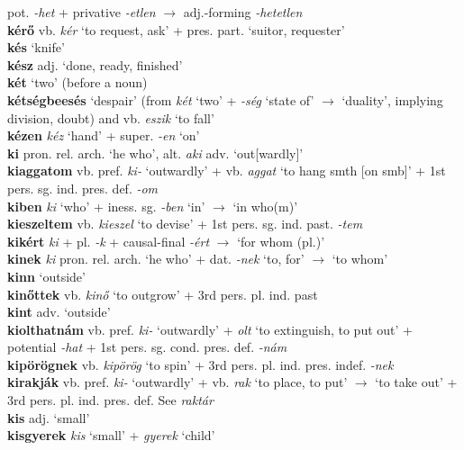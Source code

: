 \documentclass[11pt]{article}
\begin{document}
pot. \emph{-het} + privative \emph{-etlen} $\rightarrow$
adj.\hyp{}forming \emph{-hetetlen} \\
\textbf{kérő} vb. \emph{kér} `to request, ask' +
pres. part. \textbar\textbar{} `suitor, requester' \\
\textbf{kés} `knife' \\
\textbf{kész} adj. `done, ready, finished' \\
\textbf{két} `two' (before a noun) \\
\textbf{kétségbeesés} `despair' (from \emph{két} `two' + \emph{-ség}
`state of' $\rightarrow$ `duality', implying division, doubt) and
vb. \emph{eszik} `to fall' \\
\textbf{kézen} \emph{kéz} `hand' + super. \emph{-en} `on' \\
\textbf{ki} pron. rel. arch. `he who',
alt. \emph{aki} \textbar\textbar{} adv. `out[wardly]' \\
\textbf{kiaggatom} vb. pref. \emph{ki-} `outwardly' + vb. \emph{aggat}
`to hang smth [on smb]' + 1st pers. sg. ind. pres. def. \emph{-om} \\
\textbf{kiben} \emph{ki} `who' +
iness. sg. \emph{-ben} `in' $\rightarrow$ `in who(m)' \\
\textbf{kieszeltem} vb. \emph{kieszel} `to devise' + 1st
pers. sg. ind. past. \emph{-tem} \\
\textbf{kikért} \emph{ki} + pl. \emph{-k} +
causal\hyp{}final \emph{-ért} $\rightarrow$ `for whom (pl.)' \\
\textbf{kinek} \emph{ki} pron. rel. arch. `he who' + dat. \emph{-nek} `to,
for' $\rightarrow$ `to whom' \\
\textbf{kinn} `outside' \\
\textbf{kinőttek} vb. \emph{kinő} `to outgrow' + 3rd
pers. pl. ind. past \\
\textbf{kint} adv. `outside' \\
\textbf{kiolthatnám} vb. pref. \emph{ki-} `outwardly' + \emph{olt} `to
extinguish, to put out' + potential \emph{-hat} + 1st
pers. sg. cond. pres. def. \emph{-nám} \\
\textbf{kipörögnek} vb. \emph{kipörög} `to spin' + 3rd
  pers. pl. ind. pres. indef. \emph{-nek} \\
\textbf{kirakják} vb. pref. \emph{ki-} `outwardly' + vb. \emph{rak}
`to place, to put' $\rightarrow$ `to take out' + 3rd
 pers. pl. ind. pres. def. See \emph{raktár} \\
\textbf{kis} adj. `small' \\
\textbf{kisgyerek} \emph{kis} `small' + \emph{gyerek} `child' \\
\end{document}
